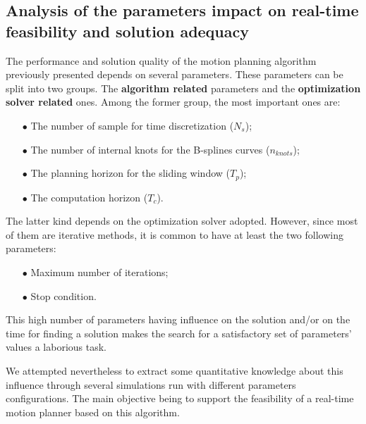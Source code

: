\subsection{Analysis of the parameters impact on real-time feasibility and solution adequacy}

The performance and solution quality of the motion planning algorithm previously presented depends on several parameters. These parameters can be split into two groups. The \textbf{algorithm related} parameters and the \textbf{optimization solver related} ones. Among the former group, the most important ones are:
\begin{itemize}
\item[$\bullet$] The number of sample for time discretization ($N_s$);
\item[$\bullet$] The number of internal knots for the B-splines curves ($n_{knots}$);
\item[$\bullet$] The planning horizon for the sliding window ($T_p$);
\item[$\bullet$] The computation horizon ($T_c$).
\end{itemize}

The latter kind depends on the optimization solver adopted. However, since most of them are iterative methods, it is common to have at least the two following parameters:
\begin{itemize}
\item[$\bullet$] Maximum number of iterations;
\item[$\bullet$] Stop condition.
\end{itemize}


This high number of parameters having influence on the solution and/or on the time for finding a solution makes the search for a satisfactory set of parameters' values a laborious task.

We attempted nevertheless to extract some quantitative knowledge about this influence through several simulations run with different parameters configurations. The main objective being to support the feasibility of a real-time motion planner based on this algorithm.

